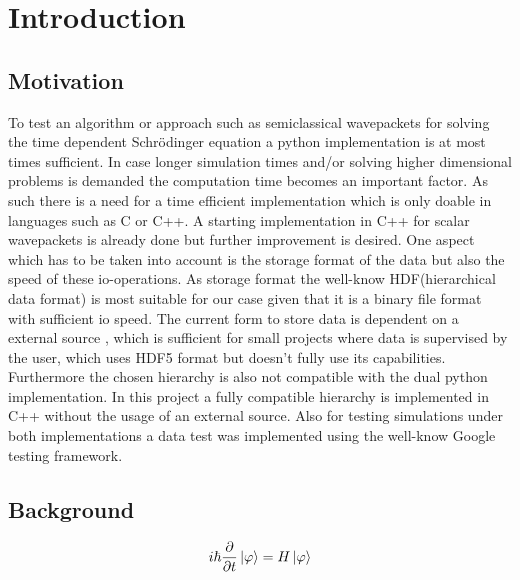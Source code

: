 \newcommand{\package}{\emph}

\chapter{Introduction}

\section{Motivation}
To test an algorithm or approach such as semiclassical wavepackets \cite{B_bachelor_thesis} for solving the time dependent Schr\"odinger equation a python implementation \cite{waveblocksnd} is at most times sufficient. In case longer simulation times and/or solving higher dimensional problems is demanded the computation time becomes an important factor. As such there is a need for a time efficient implementation which is only doable in languages such as C or C++. A starting implementation in C++ for scalar wavepackets is already done \cite{libwaveblocks} but further improvement is desired. One aspect which has to be taken into account is the storage format of the data but also the speed of these io-operations. As storage format the well-know HDF(hierarchical data format) is most suitable for our case given that it is a binary file format with sufficient io speed. The current form to store data is dependent on a external source \cite{eigen3-hdf5}, which is sufficient for small projects where data is supervised by the user, which uses HDF5 format but doesn't fully use its capabilities. Furthermore the chosen hierarchy is also not compatible with the dual python implementation. In this project a fully compatible hierarchy is implemented in C++ without the usage of an external source. Also for testing simulations under both implementations a data test was implemented using the well-know Google testing framework.

\section{Background}


\begin{equation} \label{eq:basics_tdse_simple}
  i \hbar \frac{\partial}{\partial t} \Ket{\varphi} = H \Ket{\varphi}
\end{equation}







